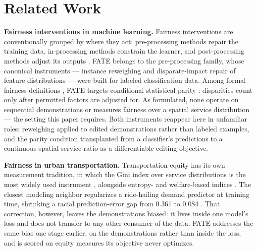 \section{Related Work}\label{sec:related}

\textbf{Fairness interventions in machine learning.} Fairness interventions
are conventionally grouped by where they act: pre-processing methods repair
the training data, in-processing methods constrain the learner, and
post-processing methods adjust its outputs \cite{barocas2023}. FATE belongs
to the pre-processing family, whose canonical instruments --- instance
reweighing \cite{kamirancalders2012} and disparate-impact repair of feature
distributions \cite{feldman2015} --- were built for labeled classification
data. Among formal fairness definitions \cite{vermarubin2018}, FATE targets
conditional statistical parity \cite{corbettdavies2017}: disparities count
only after permitted factors are adjusted for. As formulated, none operate on
sequential demonstrations or measures fairness over a spatial service
distribution --- the setting this paper requires. Both instruments reappear
here in unfamiliar roles: reweighing
applied to edited demonstrations rather than labeled examples, and the parity
condition transplanted from a classifier's predictions to a continuous
spatial service ratio as a differentiable editing objective.

\textbf{Fairness in urban transportation.} Transportation equity has its own
measurement tradition, in which the Gini index over service distributions is
the most widely used instrument \cite{horchergraham2021,karner2024},
alongside entropy- and welfare-based indices
\cite{theil1967,atkinson1970,demaio2007}. The closest modeling neighbor
regularizes a ride-hailing demand predictor at training time, shrinking a
racial prediction-error gap from 0.361 to 0.084 \cite{zheng2023}.
That correction, however, leaves the demonstrations biased: it lives inside
one model's loss and does not transfer to any other consumer of the data.
FATE addresses the same bias one stage earlier, on the demonstrations
rather than inside the loss, and is scored on equity measures its
objective never optimizes.

